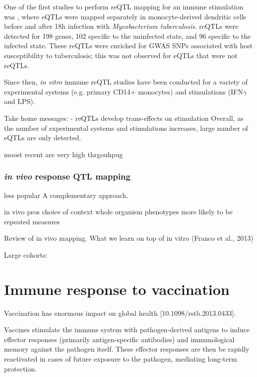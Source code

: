 One of the first studies to perform \gls{reQTL} mapping for an immune stimulation was \autocite{barreiro2012DecipheringGeneticArchitecture}, where eQTLs were mapped separately in monocyte-derived dendritic cells before and after 18h infection with \textit{Mycobacterium tuberculosis}.
reQTLs were detected for 198 genes, 102 specific to the uninfected state, and 96 specific to the infected state. 
These reQTLs were enriched for GWAS SNPs associated with host susceptibility to tuberculosis; this was not observed for eQTLs that were not reQTLs.

Since then, \textit{in vitro} immune reQTL studies have been conducted for a variety of experimental systems (e.g. primary CD14+ monocytes\autocite{fairfax2014InnateImmuneActivity}) and stimulations (IFN$\gamma$ and LPS\autocite{fairfax2014GeneticsGeneExpression}).

Take home messages:
- reQTLs develop trans-effects on stimulation \autocite{fairfax2014InnateImmuneActivity}
Overall, as the number of experimental systems and stimulations increases, large number of eQTLs are only detected.

moost recent are very high thrgouhpug

\subsubsection{\textit{in vivo} response QTL mapping}

less popular
A complementary approach.

in vivo pros
    choice of context 
    whole organism phenotypes
    more likely to be repeated measures

Review of in vivo mapping.
What we learn on top of in vitro
(Franco et al., 2013)

Large cohorts: 

\section{Immune response to vaccination}

Vaccination has enormous impact on global health [10.1098/rstb.2013.0433].

Vaccines stimulate the immune system with pathogen-derived antigens to induce effector responses (primarily antigen-specific antibodies) and immunological memory against the pathogen itself.
These effector responses are then be rapidly reactivated in cases of future exposure to the pathogen, mediating long-term protection.

